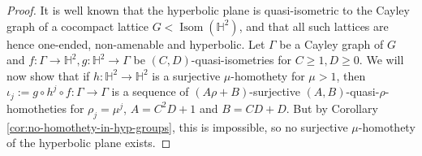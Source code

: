 \documentclass{amsart}
\theoremstyle{definition}
\theoremstyle{remark}
\theoremstyle{remark}
\theoremstyle{definition}
\renewcommand{\geq}{\geqslant}
\begin{document}
\begin{proof}
It is well known that the hyperbolic plane is quasi-isometric to the Cayley graph of a cocompact lattice $G < \operatorname{Isom}(\mathbb{H}^2)$, and that all such lattices are hence one-ended, non-amenable and hyperbolic. Let $\Gamma$ be a Cayley graph of $G$ and $f \colon \Gamma \to \mathbb{H}^2, g \colon \mathbb{H}^2 \to \Gamma$ be $(C,D)$-quasi-isometries for $C\geq 1, D \geq 0$. We will now show that if $h \colon \mathbb{H}^2 \to \mathbb{H}^2$ is a surjective $\mu$-homothety for $\mu>1$, then $\iota_j := g \circ h^j \circ f \colon \Gamma \to \Gamma$ is a sequence of $(A\rho+B)$-surjective $(A,B)$-quasi-$\rho$-homotheties for $\rho_j = \mu^j$, $A= C^2D + 1$ and $B= CD+D$. But by Corollary \ref{cor:no-homothety-in-hyp-groups}, this is impossible, so no surjective $\mu$-homothety of the hyperbolic plane exists.


\end{proof}
\end{document}
